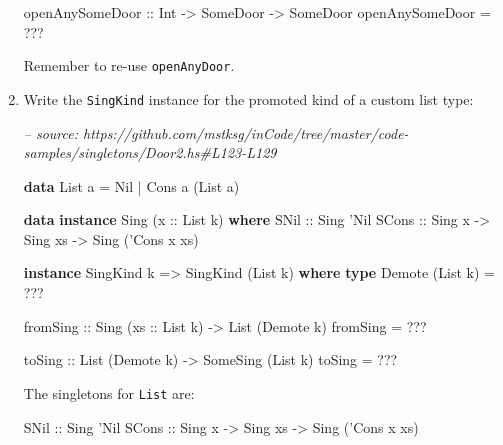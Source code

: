 \documentclass[]{article}
\newenvironment{Shaded}{}{}
\newcommand{\CommentTok}[1]{\textcolor[rgb]{0.38,0.63,0.69}{\textit{#1}}}
\newcommand{\DataTypeTok}[1]{\textcolor[rgb]{0.56,0.13,0.00}{#1}}
\newcommand{\FunctionTok}[1]{\textcolor[rgb]{0.02,0.16,0.49}{#1}}
\newcommand{\KeywordTok}[1]{\textcolor[rgb]{0.00,0.44,0.13}{\textbf{#1}}}
\newcommand{\NormalTok}[1]{#1}
\newcommand{\OtherTok}[1]{\textcolor[rgb]{0.00,0.44,0.13}{#1}}
\begin{document}
\begin{enumerate}
\begin{Shaded}
\begin{Highlighting}[]
\OtherTok{openAnySomeDoor ::} \DataTypeTok{Int} \OtherTok{->} \DataTypeTok{SomeDoor} \OtherTok{->} \DataTypeTok{SomeDoor}
\NormalTok{openAnySomeDoor }\FunctionTok{=} \FunctionTok{???}
\end{Highlighting}
\end{Shaded}

  Remember to re-use \texttt{openAnyDoor}.
\item
  Write the \texttt{SingKind} instance for the promoted kind of a custom list
  type:

\begin{Shaded}
\begin{Highlighting}[]
\CommentTok{-- source: https://github.com/mstksg/inCode/tree/master/code-samples/singletons/Door2.hs#L123-L129}

\KeywordTok{data} \DataTypeTok{List}\NormalTok{ a }\FunctionTok{=} \DataTypeTok{Nil} \FunctionTok{|} \DataTypeTok{Cons}\NormalTok{ a (}\DataTypeTok{List}\NormalTok{ a)}

\KeywordTok{data} \KeywordTok{instance} \DataTypeTok{Sing}\NormalTok{ (}\OtherTok{x ::} \DataTypeTok{List}\NormalTok{ k) }\KeywordTok{where}
    \DataTypeTok{SNil}\OtherTok{  ::} \DataTypeTok{Sing}\NormalTok{ '}\DataTypeTok{Nil}
    \DataTypeTok{SCons}\OtherTok{ ::} \DataTypeTok{Sing}\NormalTok{ x }\OtherTok{->} \DataTypeTok{Sing}\NormalTok{ xs }\OtherTok{->} \DataTypeTok{Sing}\NormalTok{ ('}\DataTypeTok{Cons}\NormalTok{ x xs)}

\KeywordTok{instance} \DataTypeTok{SingKind}\NormalTok{ k }\OtherTok{=>} \DataTypeTok{SingKind}\NormalTok{ (}\DataTypeTok{List}\NormalTok{ k) }\KeywordTok{where}
    \KeywordTok{type} \DataTypeTok{Demote}\NormalTok{ (}\DataTypeTok{List}\NormalTok{ k) }\FunctionTok{=} \FunctionTok{???}

\OtherTok{    fromSing ::} \DataTypeTok{Sing}\NormalTok{ (}\OtherTok{xs ::} \DataTypeTok{List}\NormalTok{ k) }\OtherTok{->} \DataTypeTok{List}\NormalTok{ (}\DataTypeTok{Demote}\NormalTok{ k)}
\NormalTok{    fromSing }\FunctionTok{=} \FunctionTok{???}

\OtherTok{    toSing ::} \DataTypeTok{List}\NormalTok{ (}\DataTypeTok{Demote}\NormalTok{ k) }\OtherTok{->} \DataTypeTok{SomeSing}\NormalTok{ (}\DataTypeTok{List}\NormalTok{ k)}
\NormalTok{    toSing }\FunctionTok{=} \FunctionTok{???}
\end{Highlighting}
\end{Shaded}

  The singletons for \texttt{List} are:

\begin{Shaded}
\begin{Highlighting}[]
\DataTypeTok{SNil}\OtherTok{  ::} \DataTypeTok{Sing}\NormalTok{ '}\DataTypeTok{Nil}
\DataTypeTok{SCons}\OtherTok{ ::} \DataTypeTok{Sing}\NormalTok{ x }\OtherTok{->} \DataTypeTok{Sing}\NormalTok{ xs }\OtherTok{->} \DataTypeTok{Sing}\NormalTok{ ('}\DataTypeTok{Cons}\NormalTok{ x xs)}
\end{Highlighting}
\end{Shaded}


\end{enumerate}
\end{document}
